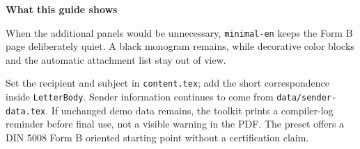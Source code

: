 


\begin{LetterBody}

\textbf{What this guide shows}

When the additional panels would be unnecessary, \texttt{minimal-en} keeps the Form B page deliberately quiet. A black monogram remains, while decorative color blocks and the automatic attachment list stay out of view.

Set the recipient and subject in \texttt{content.tex}; add the short correspondence inside \texttt{LetterBody}. Sender information continues to come from \texttt{data/sender-data.tex}. If unchanged demo data remains, the toolkit prints a compiler-log reminder before final use, not a visible warning in the PDF. The preset offers a DIN 5008 Form B oriented starting point without a certification claim.

\end{LetterBody}
